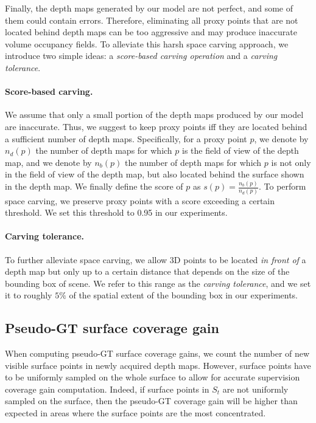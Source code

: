 Finally, the depth maps generated by our model are not perfect, and some of them could contain errors. Therefore, eliminating all proxy points that are not located behind depth maps can be too aggressive and may produce inaccurate volume occupancy fields. To alleviate this harsh space carving approach, we introduce two simple ideas: a \emph{score-based carving operation} and a \emph{carving tolerance}.

\paragraph{Score-based carving.} We assume that only a small portion of the depth maps produced by our model are inaccurate. Thus, we suggest to keep proxy points iff they are located behind a sufficient number of depth maps. 
%
Specifically, for a proxy point $p$, we denote by $n_d(p)$ the number of depth maps for which $p$ is the field of view of the depth map, and we denote by $n_b(p)$ the number of depth maps for which $p$ is not only in the field of view of the depth map, but also located behind the surface shown in the depth map.
%
We finally define the score of $p$ as $s(p) = \frac{n_b(p)}{n_d(p)}$. To perform space carving, we preserve proxy points with a score exceeding a certain threshold. We set this threshold to 0.95 in our experiments.

\paragraph{Carving tolerance.} To further alleviate space carving, we allow 3D points to be located \emph{in front of} a depth map but only up to a certain distance that depends on the size of the bounding box of scene. We refer to this range as the \emph{carving tolerance}, and we set it to roughly $5\%$ of the spatial extent of the bounding box in our experiments.

\subsection{Pseudo-GT surface coverage gain}

When computing pseudo-GT surface coverage gains, we count the number of new visible surface points in newly acquired depth maps. However, surface points have to be uniformly sampled on the whole surface to allow for accurate supervision coverage gain computation. Indeed, if surface points in $S_t$ are not uniformly sampled on the surface, then the pseudo-GT coverage gain will be higher than expected in areas where the surface points are the most concentrated.

